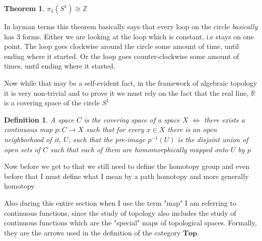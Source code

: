 \documentclass[paper=a4,fontsize=paper,12.5pt]{book}
\newcommand{\3}{\vspace*{3mm}}
\newcommand{\IFF}{$\Longleftrightarrow$ \hspace*{.5mm}}
\newcommand{\Z}{\mathbb{Z}}
\newcommand{\R}{\mathbb{R}}
\newcommand{\C}[1]{{S}^{#1}}
\begin{document}
\newtheorem{lemma}{Lemma}
\newtheorem{sublemma}{Lemma}[lemma]
\newtheorem{theorem}{Theorem}
\newtheorem{conjecture}{Conjecture}

\newtheorem{definition}{Definition}[section]
\newtheorem{problem}{Problem}
\newtheorem{corollary}{Corollary}




\begin{theorem}

${\pi}_{1}({{S}^{1}}) \cong \Z$


\end{theorem}

\newpage

In layman terms this theorem basically says that every loop on the circle \textit{basically} has $3$ forms. Either we are looking at the loop which is constant, i.e stays on one point. The loop goes clockwise around the circle some amount of time, until ending where it started. Or the loop goes counter-clockwise some amount of times, until ending where it started.

\3

Now while that may be a self-evident fact, in the framework of algebraic topology it is very non-trivial and to prove it we must rely on the fact that the real line, $\R$ is a covering space of the circle $\C{1}$

\3

\begin{definition}

A space $C$ is the covering space of a space $X$ \IFF there exists a continuous map $p:C \to X$ such that for every $x \in X$ there is an open neighborhood of it, $U$, such that the pre-image ${p}^{-1}(U)$ is the disjoint union of open sets of $C$ such that each of them are homomorphically mapped onto $U$ by $p$


\end{definition}

\3

Now before we get to that we still need to define the homotopy group and even before that I must define what I mean by a path homotopy and more generally homotopy

\3

Also during this entire section when I use the term "map" I am referring to continuous functions, since the study of topology also includes the study of continuous functions which are the "special" maps of topological spaces. Formally, they are the arrows used in the definition of the category $\mathbf{Top}$.
\end{document}
